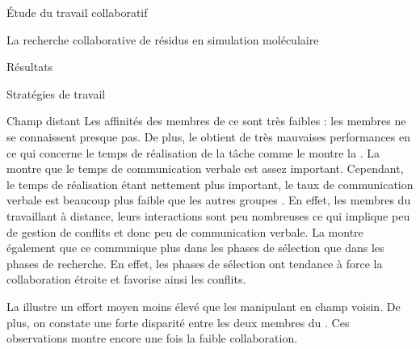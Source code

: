 \documentclass[myfrancais]{mythesis}
\begin{document}
\begin{mypart}{Étude du travail collaboratif}
\begin{mychapter}{La recherche collaborative de résidus en simulation moléculaire}
\begin{mysection}{Résultats}
\begin{mysubsection}{Stratégies de travail}
\begin{mysubsubsection}{Champ distant}
						Les affinités des membres de ce  sont très faibles  : les membres ne se connaissent presque pas.
						De plus, le  obtient de très mauvaises performances en ce qui concerne le temps de réalisation de la tâche comme le montre la .
						La  montre que le temps de communication verbale est assez important.
						Cependant, le temps de réalisation étant nettement plus important, le taux de communication verbale est beaucoup plus faible que les autres groupes .
						En effet, les membres du  travaillant à distance, leurs interactions sont peu nombreuses ce qui implique peu de gestion de conflits et donc peu de communication verbale.
						La  montre également que ce  communique plus dans les phases de sélection que dans les phases de recherche.
						En effet, les phases de sélection ont tendance à force la collaboration étroite et favorise ainsi les conflits.

						La  illustre un effort moyen moins élevé que les  manipulant en champ voisin.
						De plus, on constate une forte disparité entre les deux membres du .
						Ces observations montre encore une fois la faible collaboration.


\end{mysubsubsection}
\end{mysubsection}
\end{mysection}
\end{mychapter}
\end{mypart}
\end{document}
